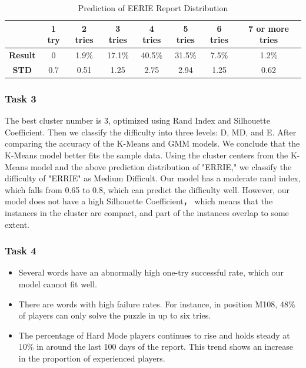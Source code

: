 \documentclass[12pt]{article}
\begin{document}
\begin{table}[h]
    \centering
    \begin{tabular}{|c|c|c|c|c|c|c|c|}
    \hline
    \textbf{}       & \textbf{1 try} & \textbf{2 tries} & \textbf{3 tries} & \textbf{4 tries} & \textbf{5 tries} & \textbf{6 tries} & \textbf{7 or more tries} \\ \hline
    \textbf{Result} & 0              & 1.9\%            & 17.1\%           & 40.5\%           & 31.5\%           & 7.5\%            & 1.2\%                    \\ \hline
    \textbf{STD}    & 0.7            & 0.51             & 1.25             & 2.75             & 2.94             & 1.25             & 0.62                     \\ \hline
    \end{tabular}
    \caption{Prediction of EERIE Report Distribution}
    \label{table8}
\end{table}

\subsubsection{Task 3}
The best cluster number is 3, optimized using Rand Index and Silhouette Coefficient. Then we classify the difficulty into three levels: D, MD, and E. After comparing the accuracy of the K-Means and GMM models. We conclude that the K-Means model better fits the sample data. Using the cluster centers from the K-Means model and the above prediction distribution of "ERRIE," we classify the difficulty of "ERRIE" as Medium Difficult. Our model has a moderate rand index, which falls from 0.65 to 0.8, which can predict the difficulty well. However, our model does not have a high Silhouette Coefficient， which means that the instances in the cluster are compact, and part of the instances overlap to some extent. 

\subsubsection{Task 4}

\begin{itemize}
    \item {Several words have an abnormally high one-try successful rate, which our model cannot fit well.}

    \item {There are words with high failure rates. For instance, in position M108, 48\% of players can only solve the puzzle in up to six tries.}

    \item {The percentage of Hard Mode players continues to rise and holds steady at $10\%$ in around the last 100 days of the report. This trend shows an increase in the proportion of experienced players.}
\end{itemize}
\end{document}
